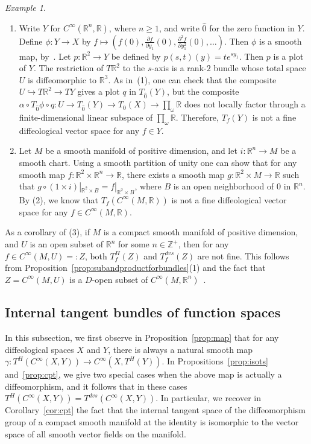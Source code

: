 \documentclass{amsart}
\theoremstyle{remark}
\newtheorem{ex}[de]{Example}
\newcommand{\ra}{\to}
\def \Z{\mathbb{Z}}
\def \R{\mathbb{R}}
\begin{document}
\begin{ex}
\begin{enumerate}
\item Write $Y$ for $C^\infty(\R^n,\R)$, where $n \geq 1$,
and write $\hat{0}$ for the zero function in $Y$.
Define $\phi:Y \ra X$ by $f \mapsto (f(0),\frac{\partial f}{\partial y_1}(0),\frac{\partial^2 f}{\partial y_1^2}(0),\ldots)$.
Then $\phi$ is a smooth map, by~\cite[Lemma~4.3]{CSW}.
Let $p:\R^2 \ra Y$ be defined by $p(s,t)(y)=te^{sy_1}$.
Then $p$ is a plot of $Y$.
The restriction of $T\R^2$ to the $s$-axis is a rank-$2$ bundle
whose total space $U$ is diffeomorphic to $\R^3$.
As in~(1), one can check that the composite
$U \hookrightarrow T\R^2 \ra TY$ gives a plot $q$ in $T_{\hat{0}}(Y)$,
but the composite
$\alpha \circ T_{\hat{0}}\phi \circ q:
U \ra T_{\hat{0}}(Y) \ra T_0(X) \ra \prod_\omega \R$
does not locally factor through a finite-dimensional linear subspace
of $\prod_\omega \R$.
Therefore, $T_f(Y)$ is not a
fine diffeological vector space for any $f \in Y$.

\item Let $M$ be a smooth manifold of positive dimension,
and let $i:\R^n \ra M$ be a smooth chart.
Using a smooth partition of unity one can show that for any smooth map $f:\R^2 \times \R^n \ra \R$,
there exists a smooth map $g:\R^2 \times M \ra \R$ such that
$g \circ (1 \times i)|_{\R^2 \times B}=f|_{\R^2 \times B}$,
where $B$ is an open neighborhood of $0$ in $\R^n$.
By (2), we know that $T_f(C^\infty(M,\R))$
is not a fine diffeological vector space
for any $f \in C^\infty(M,\R)$.
%
%
%
%
\end{enumerate}

As a corollary of (3),
if $M$ is a compact smooth manifold of positive dimension,
and $U$ is an open subset of $\R^n$ for some $n \in \Z^+$,
then for any $f \in C^\infty(M,U)=:Z$,
both $T^H_f(Z)$ and $T^{dvs}_f(Z)$ are not fine.
This follows from
Proposition~\ref{prop:subandproductforbundles}(1) and the fact that
$Z=C^\infty(M,U)$ is a $D$-open subset of
$C^\infty(M,\R^n)$~\cite[Proposition~4.2]{CSW}.
\end{ex}


\subsection{Internal tangent bundles of function spaces}\label{ss:function}

In this subsection, we first observe in Proposition~\ref{prop:map}
that for any diffeological spaces $X$ and $Y$,
there is always a natural smooth map $\gamma : T^H(C^\infty(X,Y)) \ra C^\infty(X,T^H (Y))$.
In Propositions~\ref{prop:isots} and~\ref{prop:cpt}, we give two special cases when
the above map is actually a diffeomorphism,
and it follows that in these cases $T^H(C^\infty(X,Y))=T^{dvs}(C^\infty(X,Y))$.
In particular, we recover in Corollary~\ref{cor:cpt}
the fact that the internal tangent space
of the diffeomorphism group of a compact smooth manifold at the identity
is isomorphic to the vector space of all smooth vector fields on the manifold.
\end{document}
